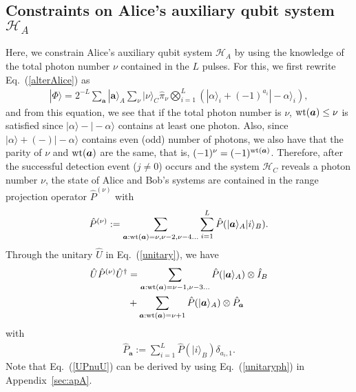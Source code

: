 \documentclass[prl,twocolumn,superscriptaddress,nofootinbib]{revtex4}
\def\U#1{{\rm #1}}
\newcommand{\ket}[1]{| #1 \rangle}
\begin{document}
\subsection{Constraints on Alice's auxiliary qubit system $\mathcal{H}_A$}
\label{sec:const}
Here, we constrain Alice's auxiliary qubit system $\mathcal{H}_A$ by using the knowledge of the
total photon number $\nu$ contained in the $L$ pulses. 
For this, we first rewrite Eq.~(\ref{alterAlice}) as
 \begin{align}
   \ket{\Phi}=2^{-L}\sum_{{\bm{a}}}\ket{{\bm{a}}}_A\sum_{\nu}\ket{\nu}_C\hat{\pi}_\nu
   \bigotimes^L_{i=1}(\ket{\alpha}_{i}+(-1)^{a_i}\ket{-\alpha}_i),
    \label{alterAlicecat}
  \end{align}
and from this equation, we see that if the total photon number is $\nu$, 
$\U{wt}({\bm{a}})\leq \nu$ is satisfied since $\ket{\alpha}-\ket{-\alpha}$ contains at least one photon. 
Also, since $\ket{\alpha}+(-)\ket{-\alpha}$ contains even (odd) number of photons, 
we also have that the parity of $\nu$ and $\U{wt}({\bm{a}})$ are the same, that is, $(-1)^{\nu}=(-1)^{\U{wt}({\bm{a}})}$. 
Therefore, after the successful detection event ($j\neq0$) occurs and the system $\mathcal{H}_C$ reveals a photon number $\nu$,
the state of Alice and Bob's systems are contained in the range projection operator $\hat{P}^{(\nu)}$ with
\begin{align}
\hat{P}^{(\nu)}:=\sum_{{\bm{a}}:\U{wt}({\bm{a}})=\nu,\nu-2,\nu-4...}\sum^L_{i=1}\hat{P}(\ket{{\bm{a}}}_A\ket{i}_B).
  \end{align}
Through the unitary $\hat{U}$ in Eq.~(\ref{unitary}), we have~\cite{Kiyoshi2012dps}
\begin{align}
  \hat{U}\hat{P}^{(\nu)}\hat{U}^{\dagger}&=
  \sum_{{\bm{a}}:\U{wt}({\bm{a}})=\nu-1,\nu-3...}\hat{P}(\ket{{\bm{a}}}_A)\otimes \hat{I}_B\notag\\
  &+\sum_{{\bm{a}}:\U{wt}({\bm{a}})=\nu+1}\hat{P}(\ket{{\bm{a}}}_A)\otimes\hat{P}_{{\bm{a}}}
  \label{UPnuU}
  \end{align}
with
\begin{align}
  \hat{P}_{\bm{a}}:=\sum^L_{i=1}\hat{P}(\ket{i}_B)\delta_{a_i,1}.
  \label{Pbma}
 \end{align}
Note that Eq.~(\ref{UPnuU}) can be derived by using Eq.~(\ref{unitaryph}) in Appendix~\ref{sec:apA}. 
\end{document}
